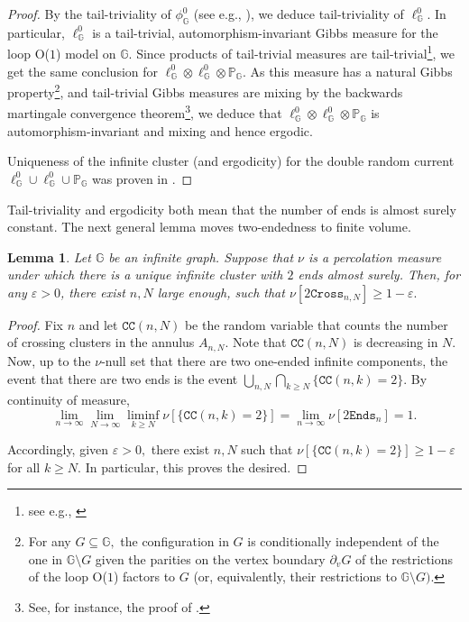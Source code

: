\documentclass[article,11pt,reqno]{amsart}
\newtheorem{lemma}[theorem]{Lemma}
\begin{document}
\begin{proof}
By the tail-triviality of $\phi^0_{\mathbb{G}}$ (see e.g., \cite[p.1113]{lyons2000phase}), we deduce tail-triviality of $\ell^0_{\mathbb{G}}.$ In particular, $\ell^0_{\mathbb{G}}$ is a tail-trivial, automorphism-invariant Gibbs measure for the loop O($1$) model on $\mathbb{G}$. Since products of tail-trivial measures are tail-trivial\footnote{see e.g., \cite[Example 7.18]{GeorgiiBook}}, we get the same conclusion for $\ell^0_{\mathbb{G}}\otimes \ell^0_{\mathbb{G}}\otimes \mathbb{P}_{\mathbb{G}}.$ As this measure has a natural Gibbs property\footnote{For any $G\subseteq \mathbb{G},$ the configuration in $G$ is conditionally independent of the one in $\mathbb{G}\setminus G$ given the parities on the vertex boundary $\partial_v G$ of the restrictions of the loop O($1$) factors to $G$ (or, equivalently, their restrictions to $\mathbb{G}\setminus G)$.}, and tail-trivial Gibbs measures are mixing by the backwards martingale convergence theorem\footnote{See, for instance, the proof of \cite[Theorem 6.58]{friedli2018}.}, we deduce that  $\ell^0_{\mathbb{G}}\otimes \ell^0_{\mathbb{G}}\otimes \mathbb{P}_{\mathbb{G}}$ is automorphism-invariant and mixing and hence ergodic.

Uniqueness of the infinite cluster (and ergodicity) for the double random current $\ell^0_{\mathbb{G}}\cup \ell^0_{\mathbb{G}}\cup \mathbb{P}_{\mathbb{G}}$ was proven in \cite[Theorem 2.5]{aizenman2015random}.
\end{proof}

Tail-triviality and ergodicity both mean that the number of ends is almost surely constant. The next general lemma moves two-endedness to finite volume.
\begin{lemma}\label{lemma:two_crossings}
    Let $\mathbb{G}$ be an infinite graph. Suppose that $\nu$ is a percolation measure under which there is a unique infinite cluster with $2$ ends almost surely. Then, for any $\varepsilon>0$, there exist $n,N$ large enough, such that $\nu[2\mathtt{Cross}_{n,N}]\geq 1-\varepsilon.$

\end{lemma}
\begin{proof}
Fix $n$ and let $\mathtt{CC}(n,N)$ be the random variable that counts the number of crossing clusters in the annulus $A_{n,N}$. Note that $\mathtt{CC}(n,N)$ is decreasing in $N$. Now, up to the $\nu$-null set that there are two one-ended infinite components, the event that there are two ends is the event
$
\bigcup_{n,N}  \bigcap_{k\geq N} \{\mathtt{CC}(n,k)=2\}.
$
By continuity of measure,
$$\lim_{n\to \infty} \lim_{N\to\infty} \liminf_{k\geq N} \nu[\{\mathtt{CC}(n,k) =2 \}]
= \lim_{n\to\infty} \nu[2\mathtt{Ends}_n] = 1.$$

Accordingly, given $\varepsilon>0,$ there exist $n,N$ such that $\nu[\{\mathtt{CC}(n,k) =2 \}]\geq 1-\varepsilon$ for all $k\geq N.$ In particular, this proves the desired.
\end{proof}
\end{document}
